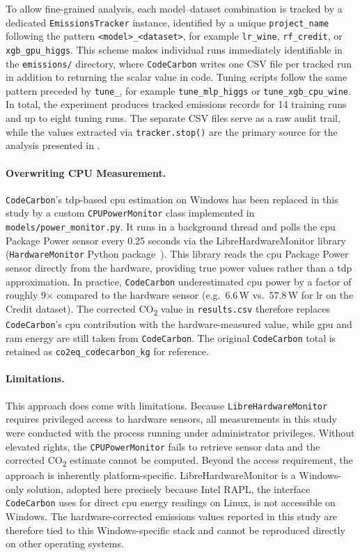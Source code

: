 To allow fine-grained analysis, each model--dataset combination is tracked by a dedicated \texttt{EmissionsTracker} instance, identified by a unique \texttt{project\_name} following the pattern \texttt{<model>\_<dataset>}, for example \texttt{lr\_wine}, \texttt{rf\_credit}, or \texttt{xgb\_gpu\_higgs}. This scheme makes individual runs immediately identifiable in the \texttt{emissions/} directory, where \texttt{CodeCarbon} writes one CSV file per tracked run in addition to returning the scalar value in code. Tuning scripts follow the same pattern preceded by \texttt{tune\_}, for example \texttt{tune\_mlp\_higgs} or \texttt{tune\_xgb\_cpu\_wine}. In total, the experiment produces tracked emissions records for 14 training runs and up to eight tuning runs. The separate CSV files serve as a raw audit trail, while the values extracted via \texttt{tracker.stop()} are the primary source for the analysis presented in .

\paragraph{Overwriting CPU Measurement.}
\texttt{CodeCarbon}'s \gls{tdp}-based \gls{cpu} estimation on Windows has been replaced in this study by a custom \texttt{CPUPowerMonitor} class implemented in \texttt{models/power\_monitor.py}. It runs in a background thread and polls the \gls{cpu} Package Power sensor every 0.25 seconds via the LibreHardwareMonitor library (\texttt{HardwareMonitor} Python package~\cite{feixSnip3rnickPyHardwareMonitor2026}). This library reads the \gls{cpu} Package Power sensor directly from the hardware, providing true power values rather than a \gls{tdp} approximation. In practice, \texttt{CodeCarbon} underestimated \gls{cpu} power by a factor of roughly 9$\times$ compared to the hardware sensor (e.g.\ 6.6\,W vs.\ 57.8\,W for \gls{lr} on the Credit dataset). The corrected CO\textsubscript{2} value in \texttt{results.csv} therefore replaces \texttt{CodeCarbon}'s \gls{cpu} contribution with the hardware-measured value, while \gls{gpu} and \gls{ram} energy are still taken from \texttt{CodeCarbon}. The original \texttt{CodeCarbon} total is retained as \texttt{co2eq\_codecarbon\_kg} for reference.

\paragraph{Limitations.}
This approach does come with limitations. Because \texttt{LibreHardwareMonitor} requires privileged access to hardware sensors, all measurements in this study were conducted with the process running under administrator privileges. Without elevated rights, the \texttt{CPUPowerMonitor} fails to retrieve sensor data and the corrected CO\textsubscript{2} estimate cannot be computed. Beyond the access requirement, the approach is inherently platform-specific. LibreHardwareMonitor is a Windows-only solution, adopted here precisely because Intel RAPL, the interface \texttt{CodeCarbon} uses for direct \gls{cpu} energy readings on Linux, is not accessible on Windows. The hardware-corrected emissions values reported in this study are therefore tied to this Windows-specific stack and cannot be reproduced directly on other operating systems.

